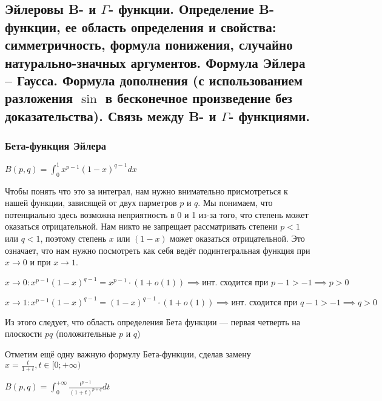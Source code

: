 \subsection{Эйлеровы B- и $\Gamma$- функции. Определение B-функции, ее область определения и свойства: симметричность, формула понижения, случайно натурально-значных аргументов. Формула Эйлера -- Гаусса. Формула дополнения (с использованием разложения $\sin$ в бесконечное произведение без доказательства). Связь между B- и $\Gamma$- функциями.}

\subsubsection{Бета-функция Эйлера}
\(
B(p, q) = \int_0^1 x^{p-1}(1 - x)^{q-1}dx
\)

Чтобы понять что это за интеграл, нам нужно внимательно присмотреться
к нашей функции, зависящей от двух парметров $p$ и $q$. Мы понимаем, что потенциально
здесь возможна неприятность в 0 и 1 из-за того, что степень может оказаться отрицательной.
Нам никто не запрещает рассматривать степени $p < 1$ или $q < 1$, поэтому степень
$x$ или $(1 - x)$ может оказаться отрицательной. Это означает, что нам нужно
посмотреть как себя ведёт подинтегральная функция при $x \to 0$ и при $x \to 1$.

\(
x \to 0: x^{p-1}(1-x)^{q - 1} = x^{p-1} \cdot (1 + o(1)) \implies
\text{инт. сходится при } p-1 > -1 \implies p > 0
\)

\(
x \to 1: x^{p-1}(1-x)^{q - 1} = (1 - x)^{q-1} \cdot (1 + o(1)) \implies
\text{инт. сходится при } q-1 > -1 \implies q > 0
\)

Из этого следует, что область определения Бета функции --- первая четверть на плоскости $pq$
(положительные $p$ и $q$)

Отметим ещё одну важную формулу Бета-функции, сделав замену
\(
x = \frac{t}{1 + t}, t \in [0; +\infty)
\)

\(
B(p, q) = \int_0^{+\infty}\frac{t^{p-1}}{(1 + t)^{p + q}}dt
\)

